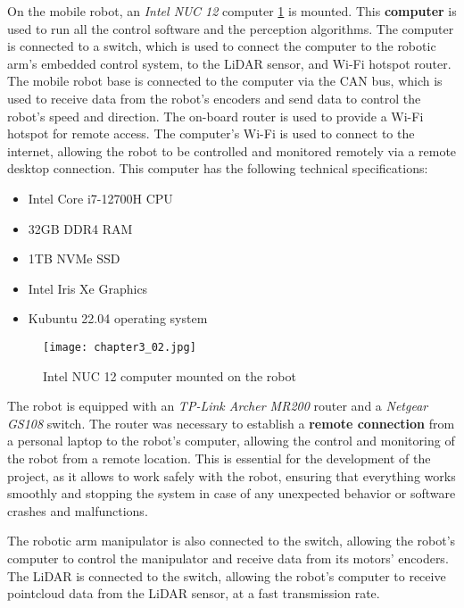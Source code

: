 On the mobile robot, an \textit{Intel NUC 12} computer \ref{fig:c3_img02} is mounted.
This \textbf{computer} is used to run all the control
software and the perception algorithms. The computer is connected to a switch, which is used to connect
the computer to the robotic arm's embedded control system, to the LiDAR sensor, and Wi-Fi hotspot router.
The mobile robot base is connected to the computer via the CAN bus, which is used to receive data from the robot's
encoders and send data to control the robot's speed and direction.
The on-board router is used to provide a Wi-Fi hotspot for remote access.
The computer's Wi-Fi is used to connect to the internet, allowing the robot to be controlled and monitored
remotely via a remote desktop connection. 
This computer has the following technical specifications:

\begin{itemize}
    \item Intel Core i7-12700H CPU
    \item 32GB DDR4 RAM
    \item 1TB NVMe SSD
    \item Intel Iris Xe Graphics
    \item Kubuntu 22.04 operating system
\end{itemize}

\begin{figure}[t]
    \centering
    \texttt{[image: chapter3\_02.jpg]}
    \captionsetup{width=1\linewidth}
    \caption{Intel NUC 12 computer mounted on the robot}
    \label{fig:c3_img02}
\end{figure}

The robot is equipped with an \textit{TP-Link Archer MR200} router and a \textit{Netgear GS108} switch.
The router was necessary to
establish a \textbf{remote connection} from a personal laptop to the robot's computer, allowing the control and monitoring
of the robot from a remote location. This is essential for the development of the project, as it allows to
work safely with the robot, ensuring that everything works smoothly and stopping the system in case of any
unexpected behavior or software crashes and malfunctions.

The robotic arm manipulator is also connected to the switch,
allowing the robot's computer to control the manipulator and receive data from its motors' encoders. 
The LiDAR is connected to the switch, allowing the robot's computer to receive pointcloud data from the LiDAR sensor,
at a fast transmission rate.
 
